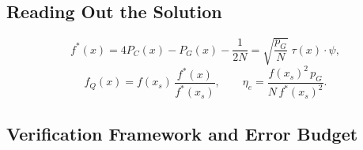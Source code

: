 \subsection{Reading Out the Solution}
\label{sec:pipeline-readout}

\begin{equation}
    f^{\ast}(x) = 4P_C(x) - P_G(x) - \frac{1}{2N} = \sqrt{\frac{p_G}{N}}\;\tau(x)\cdot\psi ,
    \label{eq:readout-identity}
\end{equation}
\begin{equation}
    f_Q(x) = f(x_s)\,\frac{f^{\ast}(x)}{f^{\ast}(x_s)},
    \qquad
    \eta_e = \frac{f(x_s)^2\,p_G}{N\,f^{\ast}(x_s)^2} .
    \label{eq:readout-field}
\end{equation}

\subsection{Verification Framework and Error Budget}
\label{sec:pipeline-verification}

